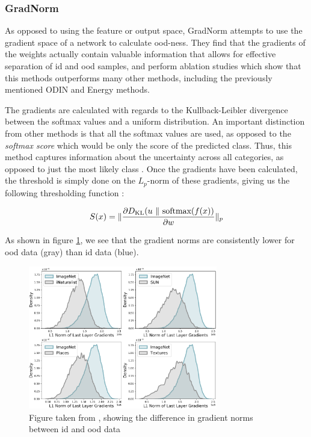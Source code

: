 \documentclass[UKenglish]{uiomasterthesis} %
\theoremstyle{definition}
\begin{document}
\subsubsection{GradNorm}

As opposed to using the feature or output space, GradNorm \cite{gradnorm} attempts to use the gradient space of a network to calculate \ac{ood}-ness. They find that the gradients of the weights actually contain valuable information that allows for effective separation of \ac{id} and \ac{ood} samples, and perform ablation studies which show that this methods outperforms many other methods, including the previously mentioned ODIN and Energy methods.

The gradients are calculated with regards to the Kullback-Leibler divergence between the softmax values and a uniform distribution. An important distinction from other methods is that all the softmax values are used, as opposed to the {\it softmax score} which would be only the score of the predicted class. Thus, this method captures information about the uncertainty across all categories, as opposed to just the most likely class \cite[3]{gradnorm}. Once the gradients have been calculated, the threshold is simply done on the $L_p$-norm of these gradients, giving us the following thresholding function \cite{gradnorm}:

\begin{equation}
\label{eq:score}
    S(\*x) = \lVert\frac{\partial D_\text{KL}(\*u~\lVert~\text{softmax}(f(\*x))}{\partial \*w}  \rVert_p
\end{equation}

As shown in figure \ref{gradnorms}, we see that the gradient norms are consistently lower for \ac{ood} data (gray) than \ac{id} data (blue).

\begin{figure}[h]
\centerline{\includegraphics[width=3.25in]{figure/gradnorm.pdf}}
\caption{Figure taken from \cite{gradnorm}, showing the difference in gradient norms between \ac{id} and \ac{ood} data}
\label{gradnorms}
\end{figure}
\end{document}
